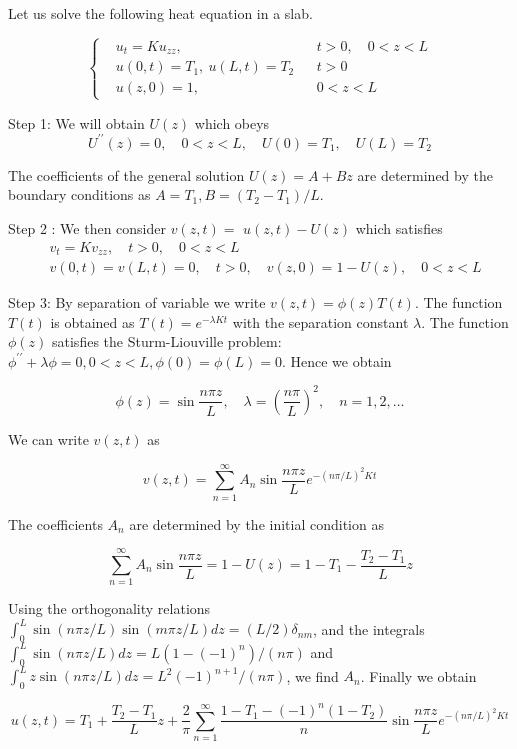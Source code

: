 \begin{example}
    Let us solve the following heat equation in a slab.

    \begin{equation}
        \left\{
        \begin{aligned}
            &u_t=K u_{z z},\quad && t>0, \quad 0<z<L \\
            &u(0, t)=T_1,\ u(L, t)=T_2 && t>0 \\
            &u(z, 0)=1,\quad && 0<z<L
        \end{aligned}
        \right.
    \end{equation}
    
    
    Step 1: We will obtain $U(z)$ which obeys
    $$
    U^{\prime \prime}(z)=0, \quad 0<z<L, \quad U(0)=T_1, \quad U(L)=T_2
    $$
    
    
    The coefficients of the general solution $U(z)=A+B z$ are determined by the boundary conditions as $A=T_1, B=\left(T_2-T_1\right) / L$. 
    
    Step 2 : We then consider $v(z, t)=$ $u(z, t)-U(z)$ which satisfies
    $$
    \begin{aligned}
    & v_t=K v_{z z}, \quad t>0, \quad 0<z<L \\
    & v(0, t)=v(L, t)=0, \quad t>0, \quad v(z, 0)=1-U(z), \quad 0<z<L
    \end{aligned}
    $$
    
    
    Step 3: By separation of variable we write $v(z, t)=\phi(z) T(t)$. The function $T(t)$ is obtained as $T(t)=e^{-\lambda K t}$ with the separation constant $\lambda$. The function $\phi(z)$ satisfies the Sturm-Liouville problem: $\phi^{\prime \prime}+\lambda \phi=0,0<z<L, \phi(0)=\phi(L)=0$. Hence we obtain
    
    $$
    \phi(z)=\sin \frac{n \pi z}{L}, \quad \lambda=\left(\frac{n \pi}{L}\right)^2, \quad n=1,2, \ldots
    $$
    
    
    We can write $v(z, t)$ as
    
    $$
    v(z, t)=\sum_{n=1}^{\infty} A_n \sin \frac{n \pi z}{L} e^{-(n \pi / L)^2 K t}
    $$
    
    
    The coefficients $A_n$ are determined by the initial condition as
    
    $$
    \sum_{n=1}^{\infty} A_n \sin \frac{n \pi z}{L}=1-U(z)=1-T_1-\frac{T_2-T_1}{L} z
    $$
    
    
    Using the orthogonality relations $\int_0^L \sin (n \pi z / L) \sin (m \pi z / L) d z=(L / 2) \delta_{n m}$, and the integrals $\int_0^L \sin (n \pi z / L) d z=L\left(1-(-1)^n\right) /(n \pi)$ and $\int_0^L z \sin (n \pi z / L) d z=L^2(-1)^{n+1} /(n \pi)$, we find $A_n$. Finally we obtain
    
    $$
    u(z, t)=T_1+\frac{T_2-T_1}{L} z+\frac{2}{\pi} \sum_{n=1}^{\infty} \frac{1-T_1-(-1)^n\left(1-T_2\right)}{n} \sin \frac{n \pi z}{L} e^{-(n \pi / L)^2 K t}
    $$       
\end{example}

